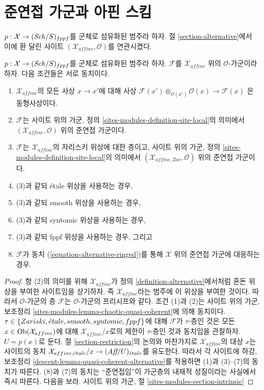 \section{준연접 가군과 아핀 스킴}
\label{section-alternative-quasi-coherent}

\noindent
$p : \mathcal{X} \to (\mathit{Sch}/S)_{fppf}$를 군체로 섬유화된 범주라 하자.
절 \ref{section-alternative}에서 이에 환 달린 사이트
$(\mathcal{X}_{affine}, \mathcal{O})$를 연관시켰다.

\begin{lemma}
\label{lemma-quasi-coherent-alternative}
$p : \mathcal{X} \to (\mathit{Sch}/S)_{fppf}$를 군체로 섬유화된 범주라 하자.
$\mathcal{F}$를 $\mathcal{X}_{affine}$ 위의 $\mathcal{O}$-가군이라 하자.
다음 조건들은 서로 동치이다.
\begin{enumerate}
\item $\mathcal{X}_{affine}$의 모든 사상 $x \to x'$에 대해 사상
$\mathcal{F}(x') \otimes_{\mathcal{O}(x')} \mathcal{O}(x) \to \mathcal{F}(x)$
은 동형사상이다.
\item $\mathcal{F}$는 사이트 위의 가군, 정의
\ref{sites-modules-definition-site-local}의 의미에서
$(\mathcal{X}_{affine}, \mathcal{O})$ 위의 준연접 가군이다.
\item $\mathcal{F}$는 $\mathcal{X}_{affine}$의 자리스키 위상에 대한 층이고,
사이트 위의 가군, 정의 \ref{sites-modules-definition-site-local}의 의미에서
$(\mathcal{X}_{affine, Zar}, \mathcal{O})$ 위의 준연접 가군이다.
\item (3)과 같되 \'etale 위상을 사용하는 경우,
\item (3)과 같되 smooth 위상을 사용하는 경우,
\item (3)과 같되 syntomic 위상을 사용하는 경우,
\item (3)과 같되 fppf 위상을 사용하는 경우, 그리고
\item $\mathcal{F}$가 동치 (\ref{equation-alternative-ringed})를 통해
$\mathcal{X}$ 위의 준연접 가군에 대응하는 경우.
\end{enumerate}
\end{lemma}

\begin{proof}
항 (2)의 의미를 위해 $\mathcal{X}_{affine}$가 정의
\ref{definition-alternative}에서처럼 혼돈 위상을 부여한 사이트임을
상기하자. 즉 $\mathcal{X}_{affine}$라는 범주에 이 위상을 부여한 것이다.
따라서 $\mathcal{O}$-가군의 층 $\mathcal{F}$는
$\mathcal{O}$-가군의 프리시프와 같다. 조건 (1)과 (2)는 사이트 위의 가군,
보조정리
\ref{sites-modules-lemma-chaotic-quasi-coherent}에 의해 동치이다.
 $\tau \in \{Zariski, {\acute{e}tale}, smooth, syntomic, fppf\}$에 대해
$\mathcal{F}$가 $\tau$-층인 것은 모든 $x \in \mathop{\mathrm{Ob}}\nolimits(\mathcal{X}_{affine})$에
대해 $\mathcal{X}_{affine}/x$로의 제한이 $\tau$-층인 것과 동치임을
관찰하자. $U = p(x)$로 둔다. 절 \ref{section-restriction}의
논의와 마찬가지로 $\mathcal{X}_{affine}$의 대상 $x$는 사이트의 동치
$\mathcal{X}_{affine, {\acute{e}tale}}/x \to (\textit{Aff}/U)_{\acute{e}tale}$를 유도한다.
따라서 각 사이트에 하강, 보조정리
\ref{descent-lemma-quasi-coherent-alternative}를 적용하면 (1)과 (3)--(7)의
동치가 따른다. (8)과 (7)의 동치는 ``준연접임''이 가군층의 내재적
성질이라는 사실에서 즉시 따른다. 다음을 보라.
사이트 위의 가군, 절 \ref{sites-modules-section-intrinsic}
\end{proof}

